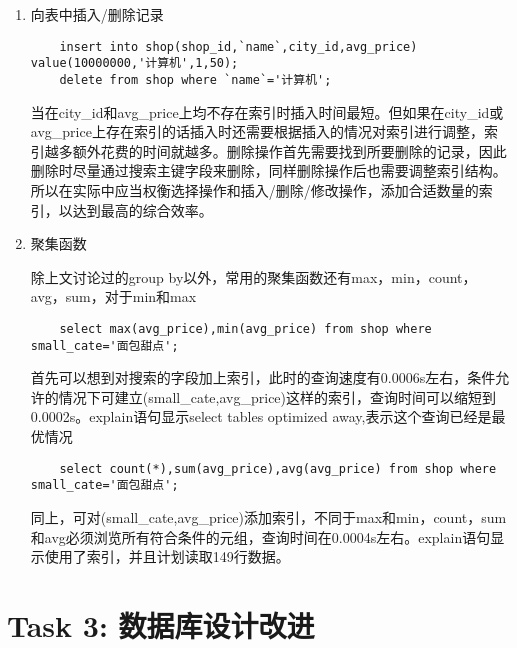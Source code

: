 \documentclass[a4paper, 11pt, nofonts, nocap, fancyhdr]{ctexart}
\begin{document}
\begin{enumerate}

	\item 向表中插入/删除记录

	\begin{lstlisting}
	insert into shop(shop_id,`name`,city_id,avg_price) value(10000000,'计算机',1,50);
	delete from shop where `name`='计算机';
	\end{lstlisting}
当在city_id和avg_price上均不存在索引时插入时间最短。但如果在city_id或avg_price上存在索引的话插入时还需要根据插入的情况对索引进行调整，索引越多额外花费的时间就越多。删除操作首先需要找到所要删除的记录，因此删除时尽量通过搜索主键字段来删除，同样删除操作后也需要调整索引结构。所以在实际中应当权衡选择操作和插入/删除/修改操作，添加合适数量的索引，以达到最高的综合效率。\\

	\item 聚集函数
	
除上文讨论过的group by以外，常用的聚集函数还有max，min，count，avg，sum，对于min和max
	\begin{lstlisting}
	select max(avg_price),min(avg_price) from shop where small_cate='面包甜点';
	\end{lstlisting}
首先可以想到对搜索的字段加上索引，此时的查询速度有0.0006s左右，条件允许的情况下可建立(small_cate,avg_price)这样的索引，查询时间可以缩短到0.0002s。explain语句显示select tables optimized away,表示这个查询已经是最优情况

	\begin{lstlisting}
	select count(*),sum(avg_price),avg(avg_price) from shop where small_cate='面包甜点';
	\end{lstlisting}
同上，可对(small_cate,avg_price)添加索引，不同于max和min，count，sum和avg必须浏览所有符合条件的元组，查询时间在0.0004s左右。explain语句显示使用了索引，并且计划读取149行数据。

\end{enumerate}

\section{Task 3: 数据库设计改进}
\end{document}
